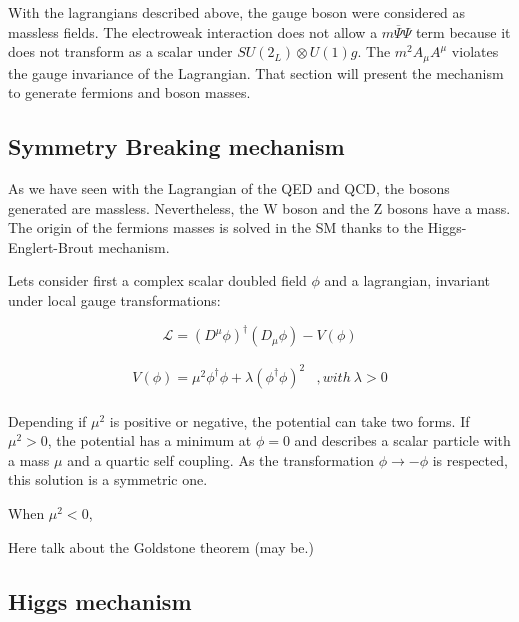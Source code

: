     With the lagrangians described above, the gauge boson were considered as massless fields.
    The electroweak interaction does not allow a $m\overline{\Psi}\Psi$ term because it does not transform as a scalar under $SU(2_L)\otimes U(1)g$.
    The $m^2A_{\mu} A^{\mu}$ violates the gauge invariance of the Lagrangian.
    That section will present the mechanism to generate fermions and boson masses.

    \subsection{Symmetry Breaking mechanism}
    
    As we have seen with the Lagrangian of the QED and QCD, the bosons generated are massless. Nevertheless, the W boson and the Z bosons have a mass. 
    The origin of the fermions masses is solved in the SM thanks to the Higgs-Englert-Brout mechanism.

    Lets consider first a complex scalar doubled field $\phi$ and a lagrangian, invariant under local gauge transformations:

    \begin{equation}
      \mathcal{L} = \left(D^{\mu} \phi \right)^{\dagger} \left( D_{\mu} \phi \right) - V(\phi)
    \end{equation}

    \begin{equation}
      \begin{array}{lr}
        V(\phi) = \mu^{2}\phi^{\dagger}\phi + \lambda \left(\phi^{\dagger}\phi\right)^2  & , with \ \lambda > 0 \\
      \end{array}   
    \end{equation}
    
    Depending if $\mu^{2}$ is positive or negative, the potential can take two forms.
    If $\mu^{2} > 0$, the potential has a minimum at $\phi = 0$ and describes a scalar particle with a mass $\mu$ and a quartic self coupling.
    As the transformation $\phi \rightarrow  - \phi$ is respected, this solution is a symmetric one.

    When $\mu^{2} < 0$, 


    Here talk about the Goldstone theorem (may be.)

    \subsection{Higgs mechanism}

